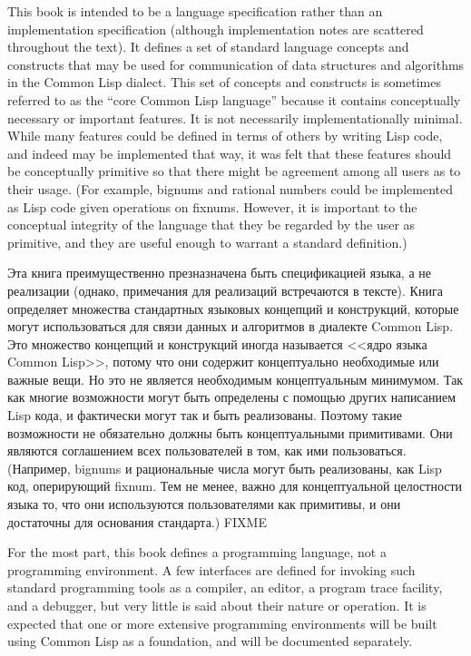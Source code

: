 This book is intended to be a language specification
rather than an implementation specification
(although implementation notes are scattered throughout the text).
It defines a set of
standard language concepts and constructs that may be used
for communication of data structures and algorithms in the Common Lisp
dialect.  This set of concepts
and constructs is sometimes referred to as the ``core Common Lisp language''
because it contains conceptually necessary or important features.
It is not necessarily implementationally minimal.
While many features could be defined in terms of others
by writing Lisp code, and indeed may be implemented that way,
it was felt that these features should be conceptually primitive
so that there might be agreement among all users as to their usage.
(For example, bignums and rational numbers could be implemented as
Lisp code given operations on fixnums.  However, it is important
to the conceptual integrity of the language that they be regarded
by the user as primitive, and they are useful enough to warrant
a standard definition.)

Эта книга преимущественно презназначена быть спецификацией языка, а не
реализации (однако, примечания для реализаций встречаются в тексте).
Книга определяет множества стандартных языковых концепций и конструкций, которые
могут использоваться для связи данных и алгоритмов в диалекте Common Lisp. Это
множество концепций и конструкций иногда называется <<ядро языка Common
Lisp>>, потому что они содержит концептуально необходимые или важные вещи. Но
это не является необходимым концептуальным минимумом. Так как многие возможности
могут быть определены с помощью других написанием Lisp кода, и фактически могут
так и быть реализованы. Поэтому такие возможности не обязательно должны быть
концептуальными примитивами. Они являются соглашением всех пользователей в том,
как ими пользоваться. (Например, bignums и рациональные числа могут быть
реализованы, как Lisp код, оперирующий fixnum. Тем не менее, важно для
концептуальной целостности языка то, что они используются пользователями как
примитивы, и они достаточны для основания стандарта.) FIXME


For the most part, this book defines a programming language, not a
programming environment.  A few interfaces are defined for
invoking such standard programming tools as a compiler, an editor,
a program trace facility, and a debugger, but very little is said
about their nature or operation.  It is expected that one or more
extensive programming environments will be built using Common Lisp as a
foundation, and will be documented separately.

